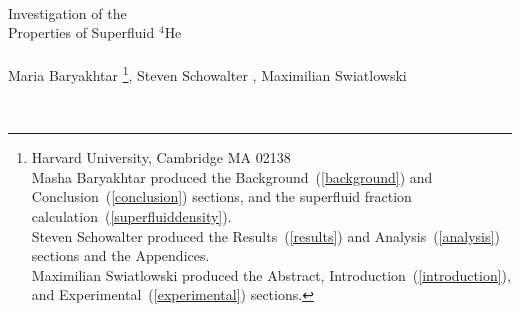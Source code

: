 \documentclass[12pt,notitlepage]{article}
\begin{document}


\begin{titlepage}
\begin{center}
\ \\
\vspace{1in}

{\Huge
Investigation of the \\ Properties of Superfluid $^{4}$He
\\}
\ \\


Maria Baryakhtar \footnote{Harvard University, Cambridge MA 02138 \\ \qquad \qquad Masha Baryakhtar produced the Background~(\ref{background}) and Conclusion~(\ref{conclusion}) sections, and the superfluid fraction calculation~(\ref{superfluiddensity}). \\ \qquad Steven Schowalter produced the Results~(\ref{results}) and Analysis~(\ref{analysis}) sections and the Appendices. \\ \qquad Maximilian Swiatlowski produced the Abstract, Introduction~(\ref{introduction}), and Experimental~(\ref{experimental}) sections.}, Steven Schowalter \footnotemark[\value{footnote}], Maximilian Swiatlowski \footnotemark[\value{footnote}] 

\ \\




\end{center}
\end{titlepage}

\clearpage


\end{document}
